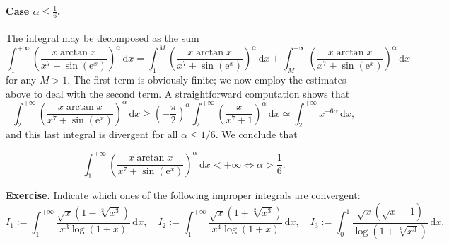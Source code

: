 \documentclass[a4paper,10 pt]{report}
\newcommand{\finalanswer}[1]{%
    \begin{finalAnswer}
    \[
        #1
    \]
    \end{finalAnswer}
}
\theoremstyle{definition}
\begin{document}
\begin{solutionBox}
\paragraph{Case $\alpha \leq \frac{1}{6}$.} The integral may be decomposed as the sum
\begin{equation*} \int_1^{+ \infty} \left( \frac{x \arctan x}{x^7 + \sin( \mathrm{e}^x )} \right)^{\alpha} \, \mathrm{d}x = \int_1^M \left( \frac{x \arctan x}{x^7 + \sin( \mathrm{e}^x )} \right)^{\alpha} \, \mathrm{d}x + \int_M^{+ \infty} \left( \frac{x \arctan x}{x^7 + \sin( \mathrm{e}^x )} \right)^{\alpha} \, \mathrm{d}x \end{equation*}
for any $M > 1$. The first term is obviously finite; we now employ the estimates above to deal with the second term. A straightforward computation shows that
\begin{equation*}\int_2^{+ \infty} \left( \frac{x \arctan x}{x^7 + \sin( \mathrm{e}^x )} \right)^{\alpha} \, \mathrm{d}x \geq \left(- \frac{\pi}{2} \right)^\alpha \int_2^{+ \infty} \left( \frac{x}{x^7 + 1} \right)^\alpha \, \mathrm{d}x \simeq \int_2^{+ \infty} x^{-6 \alpha} \, \mathrm{d}x, \end{equation*}
and this last integral is divergent for all $\alpha \leq 1/6$. We conclude that
\finalanswer{
\int_1^{+ \infty} \left( \frac{x \arctan x}{x^7 + \sin( \mathrm{e}^x )} \right)^{\alpha} \, \mathrm{d}x < + \infty \iff \alpha > \frac{1}{6}.
}\end{solutionBox}

\begin{exerciseBox} \textbf{Exercise.}  Indicate which ones of the following improper integrals are convergent:
\begin{equation*}I_1 := \int_1^{+ \infty} \frac{ \sqrt{x}(1 - \sqrt[2]{x^3})}{x^3 \log(1 + x)} \, \mathrm{d}x, \quad I_2 := \int_1^{+ \infty} \frac{ \sqrt{x}(1 + \sqrt[2]{x^3})}{x^4 \log(1 + x)} \, \mathrm{d}x, \quad I_3 := \int_0^1 \frac{ \sqrt{x}(\sqrt{x} - 1)}{ \log(1 + \sqrt[4]{x^3})} \, \mathrm{d}x.\end{equation*} \end{exerciseBox}
\end{document}
